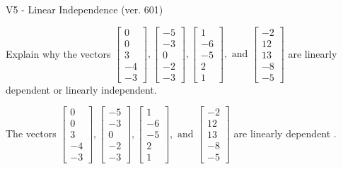 \begin{exercise}
  \begin{exerciseTitle}V5 - Linear Independence (ver. 601)\end{exerciseTitle}
  \begin{exerciseStatement}
    Explain why the vectors \(\left[\begin{array}{r}
0 \\
0 \\
3 \\
-4 \\
-3
\end{array}\right] , \left[\begin{array}{r}
-5 \\
-3 \\
0 \\
-2 \\
-3
\end{array}\right] , \left[\begin{array}{r}
1 \\
-6 \\
-5 \\
2 \\
1
\end{array}\right] , \text{ and } \left[\begin{array}{r}
-2 \\
12 \\
13 \\
-8 \\
-5
\end{array}\right]\) are linearly dependent or linearly independent.	


  \end{exerciseStatement}
  \begin{exerciseAnswer}
   The vectors \(\left[\begin{array}{r}
0 \\
0 \\
3 \\
-4 \\
-3
\end{array}\right] , \left[\begin{array}{r}
-5 \\
-3 \\
0 \\
-2 \\
-3
\end{array}\right] , \left[\begin{array}{r}
1 \\
-6 \\
-5 \\
2 \\
1
\end{array}\right] , \text{ and } \left[\begin{array}{r}
-2 \\
12 \\
13 \\
-8 \\
-5
\end{array}\right]\) are 
  	 linearly dependent  .
  


  \end{exerciseAnswer}
\end{exercise}